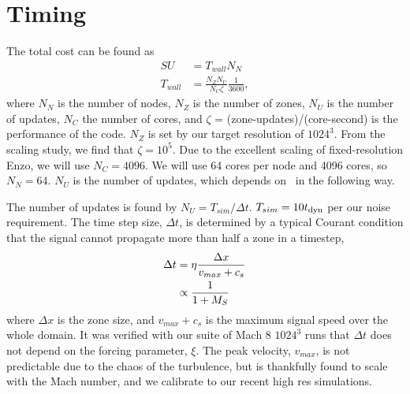\section{Timing}


The total cost can be found as
\begin{align}
SU &= T_{wall} N_N\\
T_{wall} &= \frac{N_Z N_U}{N_C \zeta} \frac{1}{3600},
\end{align}
where $N_N$ is the number of nodes, $N_Z$ is the number of zones, $N_U$ is the number of updates, $N_C$ the
number of cores, and $\zeta$ = (zone-updates)/(core-second) is the performance of
the code.  $N_Z$ is set by our target resolution of $1024^3$.  From the scaling
study, we find that $\zeta=10^5$.  Due to the excellent scaling of
fixed-resolution Enzo, we will use $N_C=4096$.
We will use 64 cores per node and 4096
cores, so $N_N=64$.
$N_U$ is the number of updates,
which depends on \Mach\ in the following way.

The number of updates is found by $N_U=T_{sim}/\Delta t$.  $T_{sim}=10t_{\rm{dyn}}$ per
our noise requirement.  The time step size, $\Delta t$, is determined by a
typical Courant condition that the signal cannot propagate more than half a zone
in a timestep,
\begin{align}
\Delta t &= \eta \frac{\Delta x}{v_{max}+ c_s}\\
&\propto \frac{1}{1+M_{S}}
\end{align}
where $\Delta x$ is the zone size, and $v_{max}+c_s$ is the maximum signal speed over
the whole domain.
It was verified with our suite of Mach 8 $1024^3$ runs that $\Delta t$ does not
depend on the forcing parameter, $\xi$.  
The peak velocity, $v_{max}$, is not predictable due to the chaos of the
turbulence, but is thankfully found to scale with the Mach number, and we
calibrate to our recent high res simulations.


